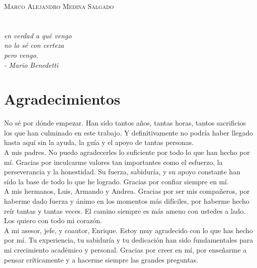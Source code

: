\documentclass[10pt, oneside]{book}
\begin{document}
\textsc{Marco Alejandro Medina Salgado}

\endgroup
\vspace*{\fill}


\pagestyle{plain}
\frontmatter

\chapter*{}
\begin{flushright}
\textit{en verdad a qué vengo \\ no lo sé con certeza \\ pero vengo. \\ - Mario Benedetti}
\end{flushright}


\chapter*{Agradecimientos}

No sé por dónde empezar. Han sido tantos años, tantas horas, tantos sacrificios los que han culminado en este trabajo. Y definitivamente no podría haber llegado hasta aquí sin la ayuda, la guía y el apoyo de tantas personas. \\

\noindent A mis padres. No puedo agradecerles lo suficiente por todo lo que han hecho por mí. Gracias por inculcarme valores tan importantes como el esfuerzo, la perseverancia y la honestidad. Su fuerza, sabiduría, y su apoyo constante han sido la base de todo lo que he logrado. Gracias por confiar siempre en mí. \\

\noindent A mis hermanos, Luis, Armando y Andrea. Gracias por ser mis compañeros, por haberme dado fuerza y ánimo en los momentos más difíciles, por haberme hecho reír tantas y tantas veces. El camino siempre es más ameno con ustedes a lado. Los quiero con todo mi corazón. \\

\noindent A mi asesor, jefe, y coautor, Enrique. Estoy muy agradecido con lo que has hecho por mí. Tu experiencia, tu sabiduría y tu dedicación han sido fundamentales para mi crecimiento académico y personal. Gracias por creer en mí, por enseñarme a pensar críticamente y a hacerme siempre las grandes preguntas. \\
\end{document}
